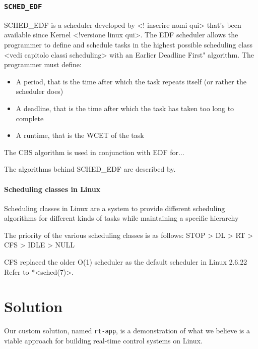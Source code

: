 \documentclass[a4paper,12pt]{report}
\begin{document}
\subsection{\texttt{SCHED\_EDF}}

SCHED\_EDF is a scheduler developed by <! inserire nomi qui> that's been available since Kernel <!versione linux qui>. The EDF scheduler allows the programmer to define and schedule tasks in the highest possible scheduling class <vedi capitolo classi scheduling> with an Earlier Deadline First" algorithm. The programmer must define:

\begin{itemize}
    \item A period, that is the time after which the task repeats itself (or rather the scheduler does)
    \item A deadline, that is the time after which the task has taken too long to complete
    \item A runtime, that is the WCET of the task
\end{itemize}

The CBS algorithm is used in conjunction with EDF for...

The algorithms behind SCHED\_EDF are described by.

\subsubsection{Scheduling classes in Linux}

Scheduling classes in Linux are a system to provide different scheduling algorithms for different kinds of tasks while maintaining a specific hierarchy 

The priority of the various scheduling classes is as follows:
STOP > DL > RT > CFS > IDLE > NULL

CFS replaced the older O(1) scheduler as the default scheduler in Linux 2.6.22 %
Refer to *<sched(7)>.

\newpage
\chapter{Solution}

Our custom solution, named \texttt{rt-app}, is a demonstration of what we believe is a viable approach for building real-time control systems on Linux.
\end{document}

